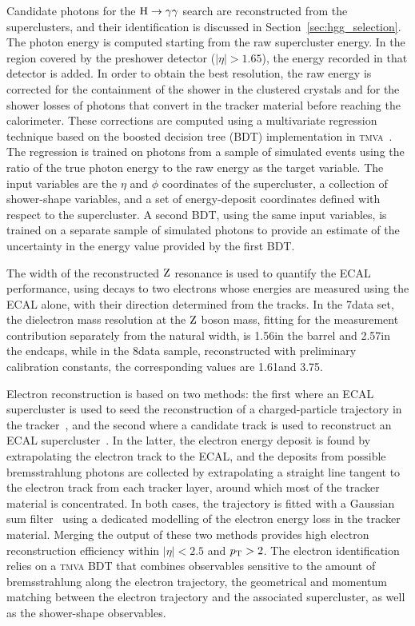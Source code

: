\documentclass[11pt,twoside,a4paper,cmspaper,final,collab]{cms-tdr}
\begin{document}
Candidate photons for the $\mathrm{H}\to\gamma\gamma$ search are reconstructed from the superclusters, and their identification is discussed in Section~\ref{sec:hgg_selection}.
The photon energy is computed starting from the raw supercluster energy.
In the region covered by the preshower detector ($|\eta| > 1.65$),
the energy recorded in that detector is added.
In order to obtain the best resolution, the raw energy is corrected
for the containment of the shower in the clustered crystals
and for the shower losses of photons that convert in
the tracker material before reaching the calorimeter.
These corrections are computed
using a multivariate regression technique based on the boosted
decision tree (BDT) implementation in \textsc{tmva}~\cite{Hocker:2007ht}.
The regression is trained on photons from a sample of simulated events using the ratio of
the true photon energy to the raw energy as the target variable.
The input variables are the $\eta$ and $\phi$ coordinates of the supercluster, a collection of
shower-shape variables, and a set of energy-deposit coordinates defined with respect to the supercluster.
A second BDT, using the same input variables, is trained on a separate sample of simulated photons to provide an
estimate of the uncertainty in the energy value provided by
the first BDT.

The width of the reconstructed $\mathrm{Z}$ resonance is used to quantify the
ECAL performance, using decays to two electrons whose energies are
measured using the ECAL alone, with their direction determined from the
tracks. In the 7\TeV data set, the dielectron mass resolution at the $\mathrm{Z}$
boson mass, fitting for the measurement contribution separately from the
natural width, is 1.56\GeV in the barrel and 2.57\GeV in the endcaps,
while in the 8\TeV data sample, reconstructed with preliminary calibration
constants, the corresponding values are 1.61\GeV and 3.75\GeV.


Electron reconstruction is based on two methods: the first where an ECAL
supercluster is used to seed the reconstruction of a
charged-particle trajectory in the tracker~\cite{Baffioni:2006cd,CMS-PAS-EGM-10-004},
and the second where a candidate track is used to reconstruct an ECAL supercluster~\cite{CMS-PAS-PFT-10-003}.
In the latter, the electron energy deposit is found by extrapolating the electron track to the ECAL,
and the deposits from possible bremsstrahlung photons are collected by extrapolating a straight line tangent to the electron track
from each tracker layer, around which most of the tracker material is concentrated.
In both cases, the trajectory is fitted with a Gaussian sum filter~\cite{Adam2005} using a dedicated modelling of the electron energy loss in the tracker material.
Merging the output of these two methods provides high electron reconstruction efficiency within $|\eta| < 2.5$ and $p_{\mathrm{T}}>2$\GeV.
The electron identification relies on a \textsc{tmva} BDT that combines observables sensitive to the
amount of bremsstrahlung along the electron trajectory, the geometrical and momentum matching between the electron trajectory and the associated supercluster, as well as  the shower-shape observables.
\end{document}
